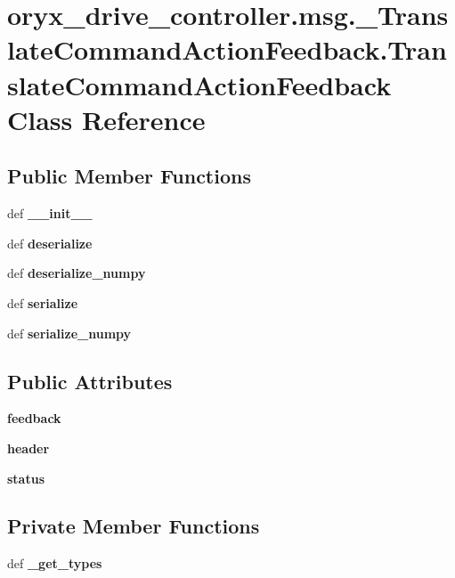 \section{oryx\-\_\-drive\-\_\-controller.\-msg.\-\_\-\-Translate\-Command\-Action\-Feedback.\-Translate\-Command\-Action\-Feedback \-Class \-Reference}
\label{classoryx__drive__controller_1_1msg_1_1__TranslateCommandActionFeedback_1_1TranslateCommandActionFeedback}
\subsection*{\-Public \-Member \-Functions}
\begin{DoxyCompactItemize}
\item 
def {\bf \-\_\-\-\_\-init\-\_\-\-\_\-}
\item 
def {\bf deserialize}
\item 
def {\bf deserialize\-\_\-numpy}
\item 
def {\bf serialize}
\item 
def {\bf serialize\-\_\-numpy}
\end{DoxyCompactItemize}
\subsection*{\-Public \-Attributes}
\begin{DoxyCompactItemize}
\item 
{\bf feedback}
\item 
{\bf header}
\item 
{\bf status}
\end{DoxyCompactItemize}
\subsection*{\-Private \-Member \-Functions}
\begin{DoxyCompactItemize}
\item 
def {\bf \-\_\-get\-\_\-types}
\end{DoxyCompactItemize}
